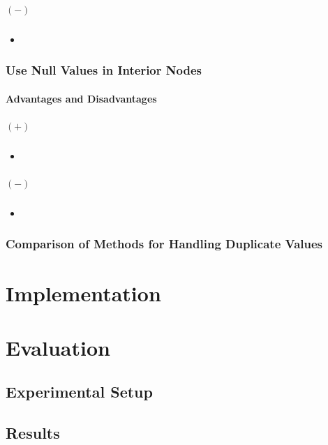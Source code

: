 \documentclass[abstracton,12pt]{scrreprt}
\begin{document}
\paragraph{$(-)$}
\begin{itemize}  
	\item  
\end{itemize}

\subsection{Use Null Values in Interior Nodes}
\subsubsection{Advantages and Disadvantages}
\paragraph{$(+)$}
\begin{itemize}  
	\item  
\end{itemize}
\paragraph{$(-)$}
\begin{itemize}  
	\item  
\end{itemize}


\subsection{Comparison of Methods for Handling Duplicate Values}



\chapter{Implementation}
\label{sec:Implementation}



\chapter{Evaluation}
\label{sec:Experimental}
\section{Experimental Setup}
\section{Results}
\end{document}
